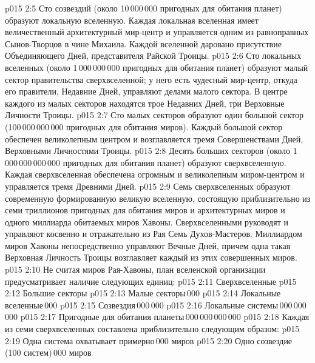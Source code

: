 \vs p015 2:5 \pc {}\bibnobreakspace {} Сто созвездий (около 10\,000\,000 пригодных для обитания планет) образуют локальную вселенную. Каждая локальная вселенная имеет величественный архитектурный мир\hyp{}центр и управляется одним из равноправных Сынов\hyp{}Творцов в чине Михаила. Каждой вселенной даровано присутствие Объединяющего Дней, представителя Райской Троицы.
\vs p015 2:6 \pc {}\bibnobreakspace {} Сто локальных вселенных (около 1\,000\,000\,000 пригодных для обитания планет) образуют малый сектор правительства сверхвселенной; у него есть чудесный мир\hyp{}центр, откуда его правители, Недавние Дней, управляют делами малого сектора. В центре каждого из малых секторов находятся трое Недавних Дней, три Верховные Личности Троицы.
\vs p015 2:7 \pc {}\bibnobreakspace {} Сто малых секторов образуют один большой сектор (100\,000\,000\,000 пригодных для обитания миров). Каждый большой сектор обеспечен великолепным центром и возглавляется тремя Совершенствами Дней, Верховными Личностями Троицы.
\vs p015 2:8 \pc {}\bibnobreakspace {} Десять больших секторов (около 1\,000\,000\,000\,000 пригодных для обитания планет) образуют сверхвселенную. Каждая сверхвселенная обеспечена огромным и великолепным миром\hyp{}центром и управляется тремя Древними Дней.
\vs p015 2:9 \pc {}\bibnobreakspace {} Семь сверхвселенных образуют современную формированную великую вселенную, состоящую приблизительно из семи триллионов пригодных для обитания миров и архитектурных миров и одного миллиарда обитаемых миров Хавоны. Сверхвселенными руководят и управляют косвенно и отражательно из Рая Семь Духов\hyp{}Мастеров. Миллиардом миров Хавоны непосредственно управляют Вечные Дней, причем одна такая Верховная Личность Троицы возглавляет каждый из этих совершенных миров.
\vs p015 2:10 \pc Не считая миров Рая\hyp{}Хавоны, план вселенской организации предусматривает наличие следующих единиц:
\vs p015 2:11 Сверхвселенные
\vs p015 2:12 Большие секторы
\vs p015 2:13 Малые секторы\,000
\vs p015 2:14 Локальные вселенные\,000
\vs p015 2:15 Созвездия\,000\,000
\vs p015 2:16 Локальные системы\,000\,000\,000
\vs p015 2:17 \pc Пригодные для обитания планеты\,000\,000\,000\,000
\vs p015 2:18 Каждая из семи сверхвселенных составлена приблизительно следующим образом:
\vs p015 2:19 Одна система охватывает примерно\,000 миров
\vs p015 2:20 Одно созвездие (100 систем)\,000 миров
